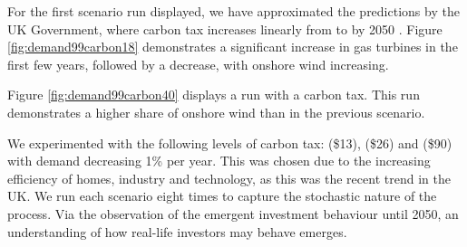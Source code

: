 



For the first scenario run displayed, we have approximated the predictions by the UK Government, where carbon tax increases linearly from  to  by 2050 \cite{Department2016}. Figure \ref{fig:demand99carbon18} demonstrates a significant increase in gas turbines in the first few years, followed by a decrease, with onshore wind increasing.

Figure \ref{fig:demand99carbon40} displays a run with a  carbon tax. This run demonstrates a higher share of onshore wind than in the previous scenario. 

We experimented with the following levels of carbon tax:  (\$13),  (\$26) and  (\$90) with demand decreasing 1\% per year. This was chosen due to the increasing efficiency of homes, industry and technology, as this was the recent trend in the UK. We run each scenario eight times to capture the stochastic nature of the process. Via the observation of the emergent investment behaviour until 2050, an understanding of how real-life investors may behave emerges.


